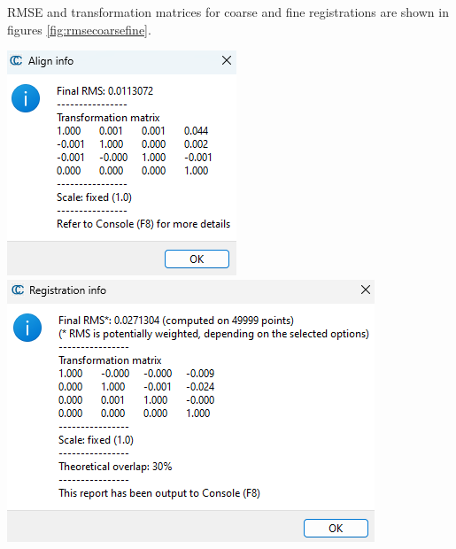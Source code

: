 \documentclass[man]{apa7}
\begin{document}
RMSE and transformation matrices for coarse and fine registrations are shown in figures \ref{fig:rmsecoarsefine}.

\begin{minipage}{\linewidth}
  \includegraphics[height=\textheight/4 ,width=\textwidth/3]{figures/RoughAlignment2.png}
  \includegraphics[height=\textheight/4 ,width=\textwidth/2]{figures/FairAlignment1-30_.png}
  \label{fig:rmsecoarsefine}
\end{minipage}
\end{document}
